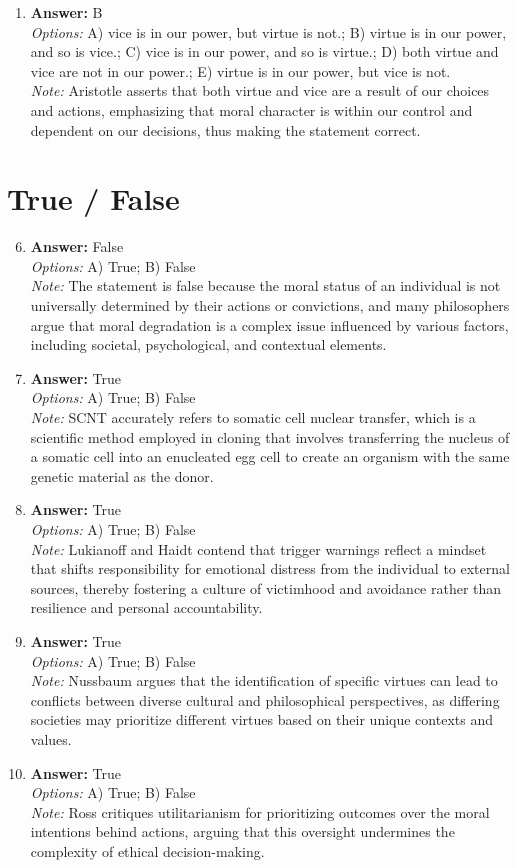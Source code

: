 \documentclass[12pt]{article}
\begin{document}
\begin{enumerate}[label=\arabic*.]
\item \textbf{Answer:} B
\\ \textit{Options:} A) vice is in our power, but virtue is not.; B) virtue is in our power, and so is vice.; C) vice is in our power, and so is virtue.; D) both virtue and vice are not in our power.; E) virtue is in our power, but vice is not.
\\ \textit{Note:} Aristotle asserts that both virtue and vice are a result of our choices and actions, emphasizing that moral character is within our control and dependent on our decisions, thus making the statement correct.
\end{enumerate}

\section*{True / False}
\begin{enumerate}[label=\arabic*.]
\setcounter{enumi}{5}
\item \textbf{Answer:} False
\\ \textit{Options:} A) True; B) False
\\ \textit{Note:} The statement is false because the moral status of an individual is not universally determined by their actions or convictions, and many philosophers argue that moral degradation is a complex issue influenced by various factors, including societal, psychological, and contextual elements.
\item \textbf{Answer:} True
\\ \textit{Options:} A) True; B) False
\\ \textit{Note:} SCNT accurately refers to somatic cell nuclear transfer, which is a scientific method employed in cloning that involves transferring the nucleus of a somatic cell into an enucleated egg cell to create an organism with the same genetic material as the donor.
\item \textbf{Answer:} True
\\ \textit{Options:} A) True; B) False
\\ \textit{Note:} Lukianoff and Haidt contend that trigger warnings reflect a mindset that shifts responsibility for emotional distress from the individual to external sources, thereby fostering a culture of victimhood and avoidance rather than resilience and personal accountability.
\item \textbf{Answer:} True
\\ \textit{Options:} A) True; B) False
\\ \textit{Note:} Nussbaum argues that the identification of specific virtues can lead to conflicts between diverse cultural and philosophical perspectives, as differing societies may prioritize different virtues based on their unique contexts and values.
\item \textbf{Answer:} True
\\ \textit{Options:} A) True; B) False
\\ \textit{Note:} Ross critiques utilitarianism for prioritizing outcomes over the moral intentions behind actions, arguing that this oversight undermines the complexity of ethical decision-making.
\end{enumerate}
\end{document}
